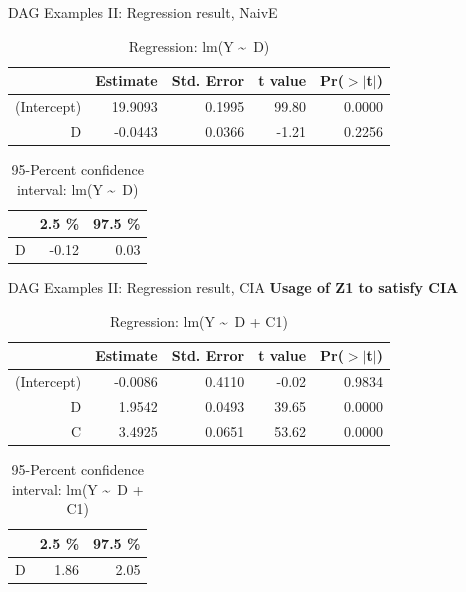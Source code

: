 \documentclass{beamer}\usepackage[]{graphicx}\usepackage[]{xcolor}
\begin{document}
\begin{frame}[fragile]{DAG Examples II: Regression result, NaivE}
\begin{table}[ht]
\centering
\begingroup\small
\begin{tabular}{rrrrr}
  \hline
 & Estimate & Std. Error & t value & Pr($>$$|$t$|$) \\ 
  \hline
(Intercept) & 19.9093 & 0.1995 & 99.80 & 0.0000 \\ 
  D & -0.0443 & 0.0366 & -1.21 & 0.2256 \\ 
   \hline
\end{tabular}
\endgroup
\caption{Regression: lm(Y \textasciitilde ~D)} 
\end{table}
\begin{table}[ht]
\centering
\begingroup\small
\begin{tabular}{rrr}
  \hline
 & 2.5 \% & 97.5 \% \\ 
  \hline
D & -0.12 & 0.03 \\ 
   \hline
\end{tabular}
\endgroup
\caption{95-Percent confidence interval: lm(Y \textasciitilde ~D)} 
\end{table}

\end{frame}

\begin{frame}[fragile]{DAG Examples II: Regression result, CIA}
\textbf{Usage of Z1 to satisfy CIA}
\begin{table}[ht]
\centering
\begingroup\small
\begin{tabular}{rrrrr}
  \hline
 & Estimate & Std. Error & t value & Pr($>$$|$t$|$) \\ 
  \hline
(Intercept) & -0.0086 & 0.4110 & -0.02 & 0.9834 \\ 
  D & 1.9542 & 0.0493 & 39.65 & 0.0000 \\ 
  C & 3.4925 & 0.0651 & 53.62 & 0.0000 \\ 
   \hline
\end{tabular}
\endgroup
\caption{Regression: lm(Y \textasciitilde ~D + C1)} 
\end{table}
\begin{table}[ht]
\centering
\begingroup\small
\begin{tabular}{rrr}
  \hline
 & 2.5 \% & 97.5 \% \\ 
  \hline
D & 1.86 & 2.05 \\ 
   \hline
\end{tabular}
\endgroup
\caption{95-Percent confidence interval: lm(Y \textasciitilde ~D + C1)} 
\end{table}

\end{frame}
\end{document}
